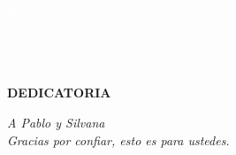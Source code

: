 \textcolor{white}{
hola \\
hola \\
hola \\
hola \\
}
\begin{flushright}
\LARGE{\textbf{DEDICATORIA}}
\end{flushright}


\begin{flushright}
\textit{A Pablo y Silvana \\
Gracias por confiar, esto es para ustedes.}
\end{flushright}